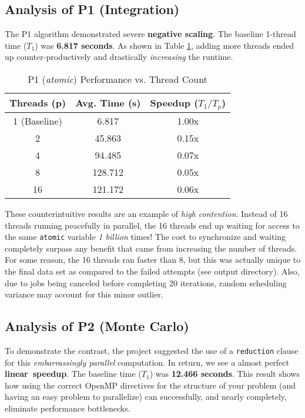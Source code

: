 \documentclass[twocolumn]{article}
\begin{document}
\subsection{Analysis of P1 (Integration)}
The P1 algorithm demonstrated severe \textbf{negative scaling}. The baseline 1-thread time ($T_1$) was \textbf{6.817 seconds}. As shown in Table \ref{tab:p1_runtimes}, adding more threads ended up counter-productively and drastically \textit{increasing} the runtime.

\begin{table}[H]
  \centering
  \caption{P1 (\textit{atomic}) Performance vs. Thread Count}
  \label{tab:p1_runtimes} %
  \begin{tabular}{@{}ccc@{}} %
    \toprule %
    {Threads (p)} & {Avg. Time (s)} & {Speedup ($T_1/T_p$)}\\
    \midrule
    {1 (Baseline)}  &{6.817}& {1.00x}\\
    {2} & {45.863}  & {0.15x} \\
    {4} & {94.485}  & {0.07x} \\
    {8} & {128.712} & {0.05x}\\
    {16}& {121.172} & 0.06x \\
    \bottomrule
  \end{tabular}
\end{table}
These counterintuitive results are an example of \textit{high contention}. Instead of 16 threads running peacefully in parallel, the 16 threads end up waiting for access to the same \texttt{atomic} variable \textit{1 billion} times! The cost to synchronize and waiting completely surpass any benefit that came from increasing the number of threads. For some reason, the 16 threads ran faster than 8, but this was actually unique to the final data set as compared to the failed attempts (see output directory). Also, due to jobs being canceled before completing 20 iterations, random scheduling variance may account for this minor outlier.

\subsection{Analysis of P2 (Monte Carlo)}
To demonstrate the contrast, the project suggested the use of a \texttt{reduction} clause for this \textit{embarrassingly parallel} computation. In return, we see a almost perfect \textbf{linear~speedup}. The baseline time ($T_1$) was \textbf{12.466 seconds}. This result shows how using the correct OpenMP directives for the structure of your problem (and having an easy problem to parallelize) can successfully, and nearly completely, eliminate performance bottlenecks.
\end{document}
